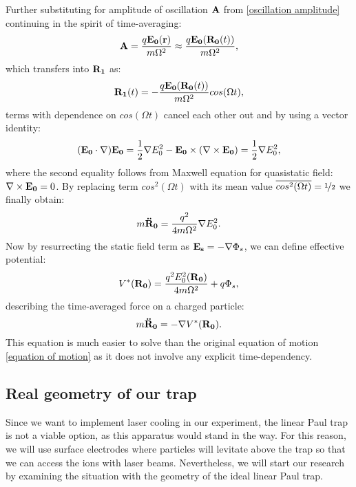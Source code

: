 Further substituting for amplitude of oscillation $\vb{A}$ from \eqref{oscillation amplitude} continuing in the spirit of time-averaging:
\begin{equation}
	\vb{A} = \frac{q \vb{E_0}(\vb{r})}{m \Omega^2} \approx \frac{q \vb{E_0}(\vb{R_0}(t))}{m \Omega^2},
\end{equation}
which transfers into $\vb{R_1}$ as:
\begin{equation}
	\vb{R_1}(t) = - \frac{q \vb{E_0}(\vb{R_0}(t))}{m \Omega^2} cos(\Omega t), 
\end{equation}
terms with dependence on $cos(\Omega t)$ cancel each other out and by using a vector identity:
\begin{equation}
	(\vb{E_0} \cdot \nabla) \vb{E_0} = \frac{1}{2} \nabla E_0^2 - \vb{E_0} \times (\nabla \times \vb{E_0}) = \frac{1}{2} \nabla E_0^2,
\end{equation}
where the second equality follows from Maxwell equation for quasistatic field: \\ $\nabla \times \vb{E_0} = 0$. By replacing term $cos^2(\Omega t)$ with its mean value $\overline{cos^2(\Omega t)} = \nicefrac{1}{2}$ we finally obtain:
\begin{equation}
	m \vb{\ddot{R}_0} = \frac{q^2}{4 m \Omega^2} \nabla E_0^2.
\end{equation}
Now by resurrecting the static field term as $\vb{E_s} = - \nabla \Phi_s$, we can define effective potential:
\begin{equation}
	\label{effective potential}
	V^*(\vb{R_0}) = \frac{q^2 E_0^2(\vb{R_0})}{4 m \Omega^2} + q \Phi_s, 
\end{equation}
describing the time-averaged force on a charged particle:
\begin{equation}
	\label{effective equation of motion}
	m \vb{\ddot{R}_0} = - \nabla V^*(\vb{R_0}). 
\end{equation}
This equation is much easier to solve than the original equation of motion \eqref{equation of motion} as it does not involve any explicit time-dependency. 

\subsection{Real geometry of our trap}
Since we want to implement laser cooling in our experiment, the linear Paul trap is not a viable option, as this apparatus would stand in the way. For this reason, we will use surface electrodes where particles will levitate above the trap so that we can access the ions with laser beams. Nevertheless, we will start our research by examining the situation with the geometry of the ideal linear Paul trap.

